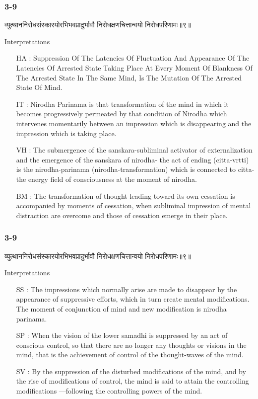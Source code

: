 \begin{frame}[fragile]\frametitle{3-9}
\begin{sanskrit}
व्युत्थाननिरोधसंस्कारयोरभिभवप्रादुर्भावौ निरोधक्षणचित्तान्वयो निरोधपरिणामः॥९॥
\end{sanskrit}

Interpretations
\begin{itemize}	
\item [HA]: Suppression Of The Latencies Of Fluctuation And Appearance Of The Latencies Of Arrested State Taking Place At Every Moment Of Blankness Of The Arrested State In The Same Mind, Is The Mutation Of The Arrested State Of Mind.		
\item [IT]: Nirodha Parinama is that transformation of the mind in which it becomes progressively permeated by that condition of Nirodha which intervenes momentarily between an impression which is disappearing and the impression which is taking place.
\item [VH]: The submergence of the sanskara-subliminal activator of externalization and the emergence of the sanskara of nirodha- the act of ending (citta-vrtti) is the nirodha-parinama (nirodha-transformation) which is connected to citta- the energy field of consciousness at the moment of nirodha.
\item [BM]: The transformation of thought leading toward its own cessation is accompanied by moments of cessation, when subliminal impression of mental distraction are overcome and those of cessation emerge in their place.
\end{itemize}
\end{frame}

\begin{frame}[fragile]\frametitle{3-9}
\begin{sanskrit}
व्युत्थाननिरोधसंस्कारयोरभिभवप्रादुर्भावौ निरोधक्षणचित्तान्वयो निरोधपरिणामः॥९॥
\end{sanskrit}

Interpretations
\begin{itemize}	
\item [SS]: The impressions which normally arise are made to disappear by the appearance of suppressive efforts, which in turn create mental modifications. The moment of conjunction of mind and new modification is nirodha parinama.
\item [SP]: When the vision of the lower samadhi is suppressed by an act of conscious control, so that there are no longer any thoughts or visions in the mind, that is the achievement of control of the thought-waves of the mind.
\item [SV]: By the suppression of the disturbed modifications of the mind, and by the rise of modifications of control, the mind is said to attain the controlling modifications —following the controlling powers of the mind. 
\end{itemize}
\end{frame}


